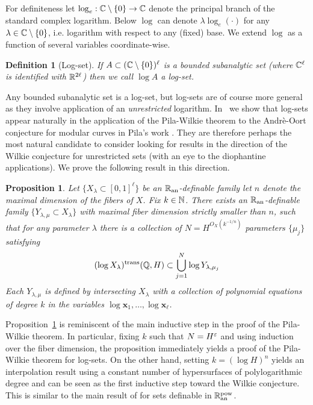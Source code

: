 \documentclass[reqno]{amsart}
\newtheorem{Prop}[Cor]{Proposition}{\bfseries}{\itshape}
\newtheorem{Def}[Cor]{Definition}{\bfseries}{\rmfamily}
\renewcommand\~[1]{\widetilde{#1}}
\def\vx{{\mathbf x}}
\def\an{{\text{an}}}
\def\trans{\mathrm{trans}}
\begin{document}
For definiteness let $\log_e:{\mathbb C}\setminus\{0\}\to{\mathbb C}$ denote the
principal branch of the standard complex logarithm. Below $\log$ can
denote $\lambda\log_e(\cdot)$ for any $\lambda\in{\mathbb C}\setminus\{0\}$,
i.e.  logarithm with respect to any (fixed) base. We extend $\log$ as
a function of several variables coordinate-wise.

\begin{Def}[Log-set]
  If $A\subset({\mathbb C}\setminus\{0\})^\ell$ is a bounded subanalytic set
  (where ${\mathbb C}^\ell$ is identified with ${\mathbb R}^{2\ell}$) then we call
  $\log A$ a log-set.
\end{Def}

Any bounded subanalytic set is a log-set, but log-sets are of course
more general as they involve application of an \emph{unrestricted}
logarithm. In~ we show that log-sets appear
naturally in the application of the Pila-Wilkie theorem to the
Andr\`e-Oort conjecture for modular curves in Pila's work
\cite{pila:andre-oort}. They are therefore perhaps the most natural
candidate to consider looking for results in the direction of the
Wilkie conjecture for unrestricted sets (with an eye to the
diophantine applications). We prove the following result in this
direction.

\begin{Prop}\label{prop:log-set-pw}
  Let $\{X_\lambda\subset[0,1]^\ell\}$ be an $\R_\an$-definable family let
  $n$ denote the maximal dimension of the fibers of $X$. Fix
  $k\in{\mathbb N}$. There exists an $\R_\an$-definable family
  $\{Y_{\lambda,\mu}\subset X_\lambda\}$ with maximal fiber dimension
  strictly smaller than $n$, such that for any parameter $\lambda$
  there is a collection of $N=H^{O_X(k^{-1/n})}$ parameters
  $\{\mu_j\}$ satisfying
  \begin{equation}
    (\log X_\lambda)^\trans(\Q,H)\subset \bigcup_{j=1}^N \log Y_{\lambda,\mu_j}
  \end{equation}
  Each $Y_{\lambda,\mu}$ is defined by intersecting $X_\lambda$ with a
  collection of polynomial equations of degree $k$ in the variables
  $\log \vx_1,\ldots,\log \vx_\ell$.
\end{Prop}

Proposition~\ref{prop:log-set-pw} is reminiscent of the main inductive
step in the proof of the Pila-Wilkie theorem. In particular, fixing
$k$ such that $N=H^\varepsilon$ and using induction over the fiber dimension,
the proposition immediately yields a proof of the Pila-Wilkie theorem
for log-sets. On the other hand, setting $k=(\log H)^n$ yields an
interpolation result using a constant number of hypersurfaces of
polylogarithmic degree and can be seen as the first inductive step
toward the Wilkie conjecture. This is similar to the main result of
\cite{cpw:params} for sets definable in $\R_{\an}^{\text{pow}}$.
\end{document}
